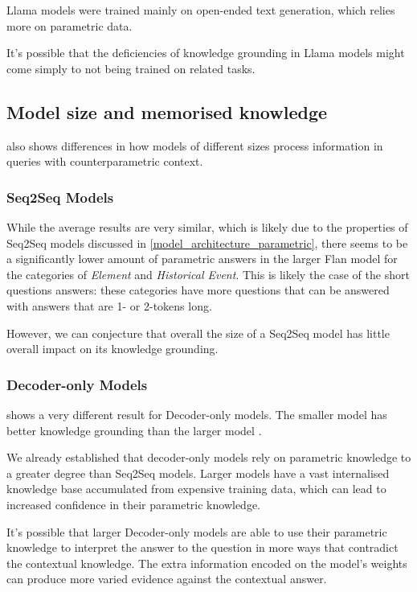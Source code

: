 Llama models were trained mainly on open-ended text generation, which relies more on parametric data.

It's possible that the deficiencies of knowledge grounding in Llama models might come simply to not being trained on related tasks.

\subsection{Model size and memorised knowledge}
\label{model_size_parametric}

 also shows differences in how models of different sizes process information in queries with counterparametric context.

\subsubsection{Seq2Seq Models}

While the average results are very similar, which is likely due to the properties of Seq2Seq models discussed in \cref{model_architecture_parametric}, there seems to be a significantly lower amount of parametric answers in the larger Flan model for the categories of \emph{Element} and \emph{Historical Event}.
This is likely the case of the short questions answers: these categories have more questions that can be answered with answers that are 1- or 2-tokens long.

However, we can conjecture that overall the size of a Seq2Seq model has little overall impact on its knowledge grounding.

\subsubsection{Decoder-only Models}

 shows a very different result for Decoder-only models.
The smaller model \smallllama{} has better knowledge grounding than the larger model \bigllama{}.

We already established that decoder-only models rely on parametric knowledge to a greater degree than Seq2Seq models.
Larger models have a vast internalised knowledge base accumulated from expensive training data, which can lead to increased confidence in their parametric knowledge.

It's possible that larger Decoder-only models are able to use their parametric knowledge to interpret the answer to the question in more ways that contradict the contextual knowledge.
The extra information encoded on the model's weights can produce more varied evidence against the contextual answer.

